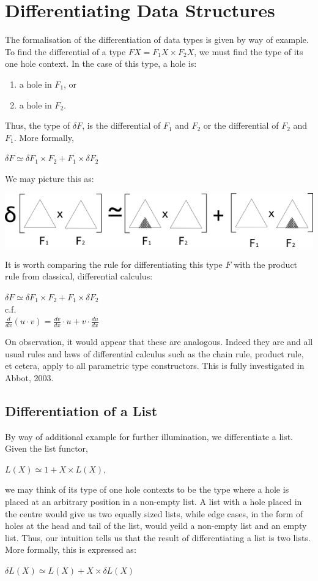 \documentclass[12pt]{report}
\begin{document}
\section{Differentiating Data Structures}
The formalisation of the differentiation of data types is given by way of example. To find the differential of a type $FX = F_{1}X \times F_{2}X$, we must find the type of its one hole context. In the case of this type, a hole is:
\begin{enumerate}
\item a hole in $F_{1}$, or
\item a hole in $F_{2}$.
\end{enumerate}
Thus, the type of $\delta F$, is the differential of $F_{1}$ and $F_{2}$ or the differential of $F_{2}$ and $F_{1}$. More formally,
\begin{center}
$\delta F \simeq \delta F_{1} \times F_{2} + F_{1} \times \delta F_{2} $
\end{center}
We may picture this as:
\begin{center}
\includegraphics[scale=0.8]{6.png}
\end{center}
It is worth comparing the rule for differentiating this type $F$ with the product rule from classical, differential calculus:
\begin{center}
$\delta F \simeq \delta F_{1} \times F_{2} + F_{1} \times \delta F_{2} $\\
c.f.
\\
$\frac{d}{dx} (u \cdot v)= \frac{dv}{dx} \cdot u + v \cdot \frac{du}{dx}$
\end{center} 
On observation, it would appear that these are analogous. Indeed they are and all usual rules and laws of differential calculus such as the chain rule, product rule, et cetera, apply to all parametric type constructors. This is fully investigated in Abbot, 2003\cite{coc}.
\subsection{Differentiation of a List}
By way of additional example for further illumination, we differentiate a list. Given the list functor,
\begin{center}
$L(X) \simeq 1 + X \times L(X)$,
\end{center} 
we may think of its type of one hole contexts to be the type where a hole is placed at an arbitrary position in a non-empty list. A list with a hole placed in the centre would give us two equally sized lists, while edge cases, in the form of holes at the head and tail of the list, would yeild a non-empty list and an empty list. Thus, our intuition tells us that the result of differentiating a list is two lists. More formally, this is expressed as:
\begin{center}
$\delta L(X) \simeq L(X) + X \times \delta L(X)$
\end{center}
\end{document}
